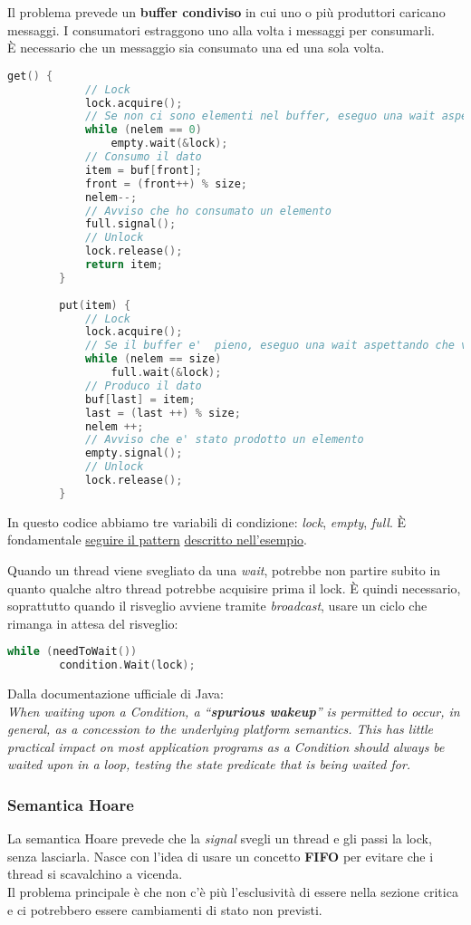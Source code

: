 \begin{example}
	Il problema prevede un \textbf{buffer condiviso} in cui uno o più produttori caricano messaggi. I consumatori estraggono uno alla volta i messaggi per consumarli.\\
	È necessario che un messaggio sia consumato una ed una sola volta.
	\begin{lstlisting}[language=C]
		get() {
			// Lock
			lock.acquire();
			// Se non ci sono elementi nel buffer, eseguo una wait aspettando che arrivi qualcosa
			while (nelem == 0)
				empty.wait(&lock);
			// Consumo il dato
			item = buf[front];
			front = (front++) % size;
			nelem--;
			// Avviso che ho consumato un elemento
			full.signal();
			// Unlock
			lock.release();
			return item;
		}
		
		put(item) {
			// Lock
			lock.acquire();
			// Se il buffer e' 	pieno, eseguo una wait aspettando che venga consumato qualcosa
			while (nelem == size)
				full.wait(&lock);
			// Produco il dato
			buf[last] = item;
			last = (last ++) % size;
			nelem ++;
			// Avviso che e' stato prodotto un elemento
			empty.signal();
			// Unlock
			lock.release();
		}
	\end{lstlisting}
	In questo codice abbiamo tre variabili di condizione: \textit{lock}, \textit{empty}, \textit{full}. È fondamentale \underline{seguire il pattern} \underline{descritto nell'esempio}.
\end{example}
Quando un thread viene svegliato da una \textit{wait}, potrebbe non partire subito in quanto qualche altro thread potrebbe acquisire prima il lock. È quindi necessario, soprattutto quando il risveglio avviene tramite \textit{broadcast}, usare un ciclo che rimanga in attesa del risveglio:
\begin{lstlisting}[language=C]
	while (needToWait())
		condition.Wait(lock);
\end{lstlisting}
Dalla documentazione ufficiale di Java: \\
\textit{When waiting upon a Condition, a “\textbf{spurious wakeup}” is permitted to occur, in general, as a concession to the underlying platform semantics. This has little practical impact on most application programs as a Condition should always be waited upon in a loop, testing the state predicate that is being waited for.}

\subsubsection{Semantica Hoare}
La semantica Hoare prevede che la \textit{signal} svegli un thread e gli passi la lock, senza lasciarla. Nasce con l'idea di usare un concetto \textbf{FIFO} per evitare che i thread si scavalchino a vicenda.\\
Il problema principale è che non c'è più l'esclusività di essere nella sezione critica e ci potrebbero essere cambiamenti di stato non previsti.

